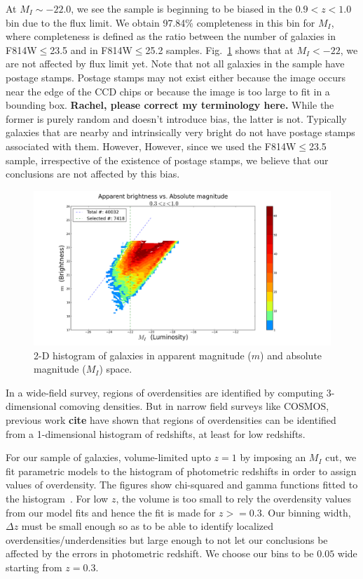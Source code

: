 \documentclass[twocolumn,useAMS,usenatbib]{mn2e}
\begin{document}
At $M_I\sim-22.0$, we see the sample is beginning to be biased in the $0.9<z<1.0$ bin due to the flux limit. We obtain 97.84\% completeness in this bin for $M_I$, where completeness is defined as the ratio between the number of galaxies in F814W$\le$23.5 and in F814W$\le$25.2 samples.
Fig.~\ref{fig:2Dhist} shows that at $M_I<-22$, we are not affected by flux limit yet. Note that not all galaxies in the sample have postage stamps.
Postage stamps may not exist either because the image occurs near the edge of the CCD chips or because the image is too large to fit in a bounding box. {\bf Rachel, please correct my terminology here.}
While the former is purely random and doesn't introduce bias, the latter is not. Typically galaxies that are nearby and intrinsically very bright do not have postage stamps associated with them. However,
However, since we used the F814W$\le$23.5 sample, irrespective of the existence of postage stamps, we believe that our conclusions are not affected by this bias.

\begin{figure}
  \centering
   \includegraphics[width=\columnwidth]{fig1}
   \caption{2-D histogram of galaxies in apparent magnitude ($m$) and absolute magnitude ($M_I$) space.}
   \label{fig:2Dhist}
 \end{figure}

 
In a wide-field survey, regions of overdensities are identified by computing 3-dimensional comoving densities. But in narrow field surveys like COSMOS, previous work {\bf cite } have shown
that regions of overdensities can be identified from a 1-dimensional histogram of redshifts, at least for low redshifts. 

For our sample of galaxies, volume-limited upto $z=1$ by imposing an $M_I$ cut, we fit parametric models to the histogram of photometric redshifts in order to assign values of overdensity. The figures show chi-squared and gamma functions fitted to the histogram~\citep{Redshift_modelling}.
For low $z$, the volume is too small to rely the overdensity values from our model fits and hence the fit is made for $z>=0.3$. Our binning width, $\Delta z$ must be small enough so as to be able to identify localized overdensities/underdensities but large enough to not let our conclusions be affected by the errors in photometric redshift. 
We choose our bins to be $0.05$ wide starting from $z=0.3$. 
\end{document}
